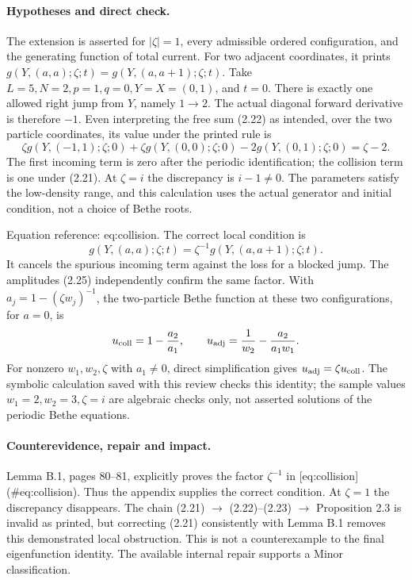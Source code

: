 \documentclass[10pt]{article}
\begin{document}
\paragraph*{Hypotheses and direct check.}\mbox{}\par
The extension is asserted for \(|\zeta|=1\), every admissible ordered configuration, and the generating function of total current. For two adjacent coordinates, it prints \(g(Y,(a,a);\zeta;t)=g(Y,(a,a+1);\zeta;t)\). Take \(L=5,N=2,p=1,q=0,Y=X=(0,1)\), and \(t=0\). There is exactly one allowed right jump from \(Y\), namely \(1\to2\). The actual diagonal forward derivative is therefore \(-1\). Even interpreting the free sum (2.22) as intended, over the two particle coordinates, its value under the printed rule is \[\zeta g(Y,(-1,1);\zeta;0)
 +\zeta g(Y,(0,0);\zeta;0)-2g(Y,(0,1);\zeta;0)
 =\zeta-2.\] The first incoming term is zero after the periodic identification; the collision term is one under (2.21). At \(\zeta=i\) the discrepancy is \(i-1\ne0\). The parameters satisfy the low-density range, and this calculation uses the actual generator and initial condition, not a choice of Bethe roots.\par
Equation reference: eq:collision. The correct local condition is \[
 g(Y,(a,a);\zeta;t)
 =\zeta^{-1}g(Y,(a,a+1);\zeta;t).\] It cancels the spurious incoming term against the loss for a blocked jump. The amplitudes (2.25) independently confirm the same factor. With \(a_j=1-(\zeta w_j)^{-1}\), the two-particle Bethe function at these two configurations, for \(a=0\), is \[u_{\rm coll}=1-\frac{a_2}{a_1},\qquad
 u_{\rm adj}=\frac1{w_2}-\frac{a_2}{a_1w_1}.\] For nonzero \(w_1,w_2,\zeta\) with \(a_1\ne0\), direct simplification gives \(u_{\rm adj}=\zeta u_{\rm coll}\). The symbolic calculation saved with this review checks this identity; the sample values \(w_1=2,w_2=3,\zeta=i\) are algebraic checks only, not asserted solutions of the periodic Bethe equations.\par
\paragraph*{Counterevidence, repair and impact.}\mbox{}\par
Lemma B.1, pages 80–81, explicitly proves the factor \(\zeta^{-1}\) in [eq:collision] (\#eq:collision). Thus the appendix supplies the correct condition. At \(\zeta=1\) the discrepancy disappears. The chain (2.21) \(\to\) (2.22)–(2.23) \(\to\) Proposition 2.3 is invalid as printed, but correcting (2.21) consistently with Lemma B.1 removes this demonstrated local obstruction. This is not a counterexample to the final eigenfunction identity. The available internal repair supports a Minor classification.\par
\end{document}
